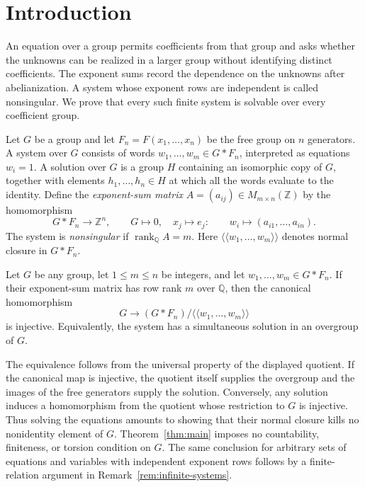 \section{Introduction}
\label{sec:intro}

An equation over a group permits coefficients from that group and asks
whether the unknowns can be realized in a larger group without identifying
distinct coefficients. The exponent sums record the dependence on the
unknowns after abelianization. A system whose exponent rows are independent
is called nonsingular. We prove that every such
finite system is solvable over every coefficient group.

Let $G$ be a group and let $F_n=F(x_1,\ldots,x_n)$ be the free group on
$n$ generators. A system over $G$ consists of words
$w_1,\ldots,w_m\in G*F_n$, interpreted as equations $w_i=1$. A solution
over $G$ is a group $H$ containing an isomorphic copy of $G$, together
with elements $h_1,\ldots,h_n\in H$ at which all the words evaluate
to the identity. Define the \emph{exponent-sum matrix}
$A=(a_{ij})\in M_{m\times n}(\mathbb Z)$ by the homomorphism
\[
 G*F_n\longrightarrow\mathbb Z^n,
 \qquad G\longmapsto0,\quad x_j\longmapsto e_j:
 \qquad w_i\longmapsto(a_{i1},\ldots,a_{in}).
\]
The system is \emph{nonsingular} if $\operatorname{rank}_{\mathbb Q}A=m$.
Here $\langle\!\langle w_1,\ldots,w_m\rangle\!\rangle$ denotes normal
closure in $G*F_n$.

\begin{theorem}\label{thm:main}
Let $G$ be any group, let $1\le m\le n$ be integers, and let
$w_1,\ldots,w_m\in G*F_n$. If their exponent-sum matrix has row rank
$m$ over $\mathbb Q$, then the canonical homomorphism
\[
 G\longrightarrow
 (G*F_n)/\langle\!\langle w_1,\ldots,w_m\rangle\!\rangle
\]
is injective. Equivalently, the system has a simultaneous solution in
an overgroup of $G$.
\end{theorem}

The equivalence follows from the universal property of the displayed
quotient. If the canonical map is injective, the quotient itself supplies
the overgroup and the images of the free generators supply the solution.
Conversely, any solution induces a homomorphism from the quotient whose
restriction to $G$ is injective. Thus solving the equations amounts to
showing that their normal closure kills no nonidentity element of $G$.
Theorem~\ref{thm:main} imposes no countability, finiteness, or torsion
condition on $G$. The same conclusion for arbitrary sets of equations
and variables with independent exponent rows follows by a finite-relation
argument in Remark~\ref{rem:infinite-systems}.

